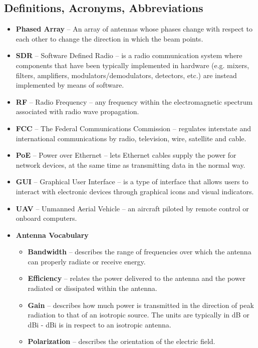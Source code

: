 \documentclass[ProjectRequirements.tex]{subfiles}
\begin{document}
	\subsection{Definitions, Acronyms, Abbreviations}
		\begin{itemize}
			\item \textbf{Phased Array} -- An array of antennas whose phases change with respect to each other to change the direction in which the beam points.
			\item \textbf{SDR} -- Software Defined Radio -- is a radio communication system where components that have been typically implemented in hardware (e.g. mixers, filters, amplifiers, modulators/demodulators, detectors, etc.) are instead implemented by means of software. 
			\item \textbf{RF} -- Radio Frequency --  any frequency within the electromagnetic spectrum associated with radio wave propagation. 
			\item \textbf{FCC} -- The Federal Communications Commission -- regulates interstate and international communications by radio, television, wire, satellite and cable.
			\item \textbf{PoE} -- Power over Ethernet -- lets Ethernet cables supply the power for network devices, at the same time as transmitting data in the normal way. 
			\item \textbf{GUI} -- Graphical User Interface -- is a type of interface that allows users to interact with electronic devices through graphical icons and visual indicators.
			\item \textbf{UAV} -- Unmanned Aerial Vehicle -- an aircraft piloted by remote control or onboard computers.
			\item \textbf{Antenna Vocabulary}
			\begin{itemize}
				\item \textbf{Bandwidth} -- describes the range of frequencies over which the antenna can properly radiate or receive energy.
				\item \textbf{Efficiency} -- relates the power delivered to the antenna and the power radiated or dissipated within the antenna.
				\item \textbf{Gain} -- describes how much power is transmitted in the direction of peak radiation to that of an isotropic source. The units are typically in dB or dBi - dBi is in respect to an isotropic antenna. 
				\item \textbf{Polarization} -- describes the orientation of the electric field.
			\end{itemize}
		\end{itemize}
\end{document}
